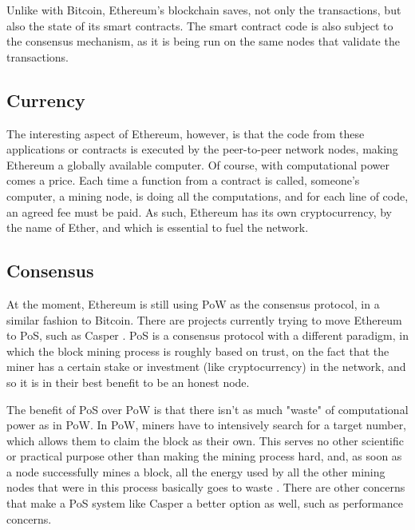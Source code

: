 Unlike with Bitcoin, Ethereum's blockchain saves, not only the transactions, but also the state of its smart contracts. The smart contract code is also subject to the consensus mechanism, as it is being run on the same nodes that validate the transactions.


\subsection{Currency}

The interesting aspect of Ethereum, however, is that the code from these applications or contracts is executed by the peer-to-peer network nodes, making Ethereum a globally available computer. Of course, with computational power comes a price. Each time a function from a contract is called, someone's computer, a mining node, is doing all the computations, and for each line of code, an agreed fee must be paid. As such, Ethereum has its own cryptocurrency, by the name of Ether, and which is essential to fuel the network.

\subsection{Consensus}

At the moment, Ethereum is still using PoW as the consensus protocol, in a similar fashion to Bitcoin. There are projects currently trying to move Ethereum to PoS, such as Casper \cite{Buterin2017}. PoS is a consensus protocol with a different paradigm, in which the block mining process is roughly based on trust, on the fact that the miner has a certain stake or investment (like cryptocurrency) in the network, and so it is in their best benefit to be an honest node. 

The benefit of PoS over PoW is that there isn't as much "waste" of computational power as in PoW. In PoW, miners have to intensively search for a target number, which allows them to claim the block as their own. This serves no other scientific or practical purpose other than making the mining process hard, and, as soon as a node successfully mines a block, all the energy used  by all the other mining nodes that were in this process basically goes to waste \cite{Buterin2013}. There are other concerns that make a PoS system like Casper a better option as well, such as performance concerns. 

